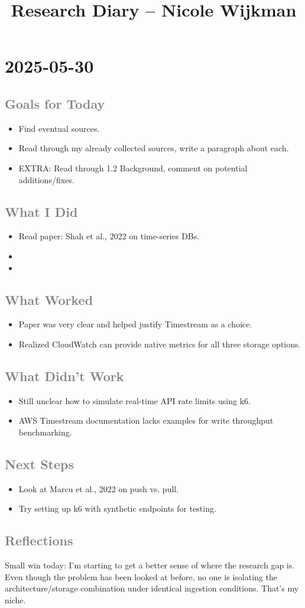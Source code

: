 \documentclass[11pt]{article}
\title{Research Diary – Nicole Wijkman}
\author{}
\date{}
\newcommand{\entrydate}[1]{\section*{#1}}
\newcommand{\subheading}[1]{\subsection*{\textcolor{gray}{#1}}}
\begin{document}
\maketitle

\tableofcontents
\newpage

\entrydate{2025-05-30}

\subheading{Goals for Today}
\begin{itemize}[leftmargin=*]
    \item Find eventual sources.
    \item Read through my already collected sources, write a paragraph about each.
    \item EXTRA: Read through 1.2 Background, comment on potential additions/fixes.
\end{itemize}

\subheading{What I Did}
\begin{itemize}[leftmargin=*]
    \item Read paper: Shah et al., 2022 on time-series DBs.
    \item 
    \item 
\end{itemize}

\subheading{What Worked}
\begin{itemize}[leftmargin=*]
    \item Paper was very clear and helped justify Timestream as a choice.
    \item Realized CloudWatch can provide native metrics for all three storage options.
\end{itemize}

\subheading{What Didn't Work}
\begin{itemize}[leftmargin=*]
    \item Still unclear how to simulate real-time API rate limits using k6.
    \item AWS Timestream documentation lacks examples for write throughput benchmarking.
\end{itemize}

\subheading{Next Steps}
\begin{itemize}[leftmargin=*]
    \item Look at Marcu et al., 2022 on push vs. pull.
    \item Try setting up k6 with synthetic endpoints for testing.
\end{itemize}

\subheading{Reflections}
Small win today: I'm starting to get a better sense of where the research gap is. Even though the problem has been looked at before, no one is isolating the architecture/storage combination under identical ingestion conditions. That’s my niche.

\newpage

\end{document}
